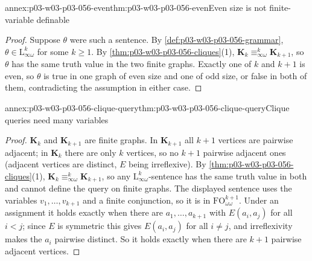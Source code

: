 \begin{annexitem}{annex:p03-w03-p03-056-even}{thm:p03-w03-p03-056-even}{Even size is not finite-variable definable}
\begin{proof}
Suppose \(\theta\) were such a sentence. By
\cref{def:p03-w03-p03-056-grammar}, \(\theta\in\mathrm{L}^k_{\infty\omega}\)
for some \(k\geq1\). By \cref{thm:p03-w03-p03-056-cliques}(1),
\(\mathbf K_k\equiv^k_{\infty\omega}\mathbf K_{k+1}\), so \(\theta\) has the
same truth value in the two finite graphs. Exactly one of \(k\) and \(k+1\) is
even, so \(\theta\) is true in one graph of even size and one of odd size, or
false in both of them, contradicting the assumption in either case.
\end{proof}
\end{annexitem}

\begin{annexitem}{annex:p03-w03-p03-056-clique-query}{thm:p03-w03-p03-056-clique-query}{Clique queries need many variables}
\begin{proof}
\(\mathbf K_k\) and \(\mathbf K_{k+1}\) are finite graphs. In
\(\mathbf K_{k+1}\) all \(k+1\) vertices are pairwise adjacent; in
\(\mathbf K_k\) there are only \(k\) vertices, so no \(k+1\) pairwise
adjacent ones (adjacent vertices are distinct, \(E\) being irreflexive).
By \cref{thm:p03-w03-p03-056-cliques}(1),
\(\mathbf K_k\equiv^k_{\infty\omega}\mathbf K_{k+1}\), so any
\(\mathrm{L}^k_{\infty\omega}\)-sentence has the same truth value in both and
cannot define the query on finite graphs. The displayed sentence uses the
variables \(v_1,\ldots,v_{k+1}\) and a finite conjunction, so it is in
\(\mathrm{FO}^{k+1}_{\omega\omega}\). Under an assignment it holds exactly
when there are \(a_1,\ldots,a_{k+1}\) with \(E(a_i,a_j)\) for all \(i<j\);
since \(E\) is symmetric this gives \(E(a_i,a_j)\) for all \(i\neq j\), and
irreflexivity makes the \(a_i\) pairwise distinct. So it holds exactly when
there are \(k+1\) pairwise adjacent vertices.
\end{proof}
\end{annexitem}

